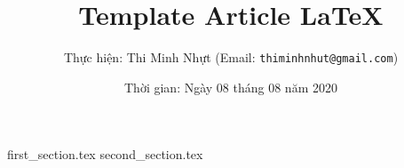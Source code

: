 \documentclass[12pt,a4paper]{article}
\title{\bfseries Template Article \LaTeX}
\author{Thực hiện: Thi Minh Nhựt (Email: \texttt{thiminhnhut@gmail.com})}
\date{Thời gian: Ngày 08 tháng 08 năm 2020}
\begin{document}
\maketitle

\tableofcontents

{first_section.tex}
{second_section.tex}
\end{document}
